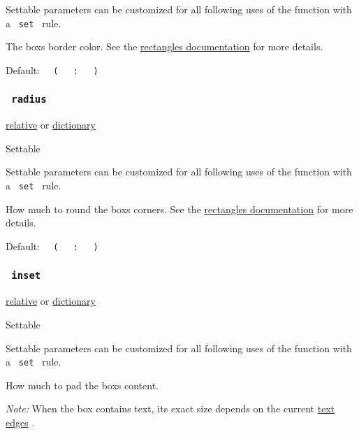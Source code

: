\label{parameters-stroke-settable-tooltip}
Settable parameters can be customized for all following uses of the
function with a \texttt{\ set\ } rule.

The box\textquotesingle s border color. See the
\href{/docs/reference/visualize/rect/\#parameters-stroke}{rectangle\textquotesingle s
documentation} for more details.

Default:
\texttt{\ }{\texttt{\ (\ }}\texttt{\ }{\texttt{\ :\ }}\texttt{\ }{\texttt{\ )\ }}\texttt{\ }

\subsubsection{\texorpdfstring{\texttt{\ radius\ }}{ radius }}\label{parameters-radius}

\href{/docs/reference/layout/relative/}{relative} {or}
\href{/docs/reference/foundations/dictionary/}{dictionary}

{{ Settable }}

\label{parameters-radius-settable-tooltip}
Settable parameters can be customized for all following uses of the
function with a \texttt{\ set\ } rule.

How much to round the box\textquotesingle s corners. See the
\href{/docs/reference/visualize/rect/\#parameters-radius}{rectangle\textquotesingle s
documentation} for more details.

Default:
\texttt{\ }{\texttt{\ (\ }}\texttt{\ }{\texttt{\ :\ }}\texttt{\ }{\texttt{\ )\ }}\texttt{\ }

\subsubsection{\texorpdfstring{\texttt{\ inset\ }}{ inset }}\label{parameters-inset}

\href{/docs/reference/layout/relative/}{relative} {or}
\href{/docs/reference/foundations/dictionary/}{dictionary}

{{ Settable }}

\label{parameters-inset-settable-tooltip}
Settable parameters can be customized for all following uses of the
function with a \texttt{\ set\ } rule.

How much to pad the box\textquotesingle s content.

\emph{Note:} When the box contains text, its exact size depends on the
current \href{/docs/reference/text/text/\#parameters-top-edge}{text
edges} .

